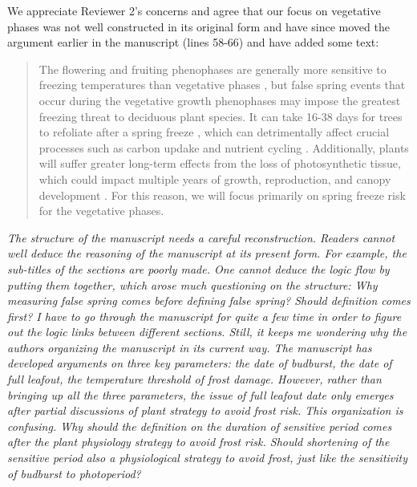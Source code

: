\documentclass[11pt,a4paper]{article}
\begin{document}
We appreciate Reviewer 2's concerns and agree that our focus on vegetative phases was not well constructed in its original form and have since moved the argument earlier in the manuscript (lines 58-66) and have added some text: \\

\begin{quote}
The flowering and fruiting phenophases are generally more sensitive to freezing temperatures than vegetative phases \citep{Inouye2000, Augspurger2009, Caradonna2016, Lenz2013}, but false spring events that occur during the vegetative growth phenophases may impose the greatest freezing threat to deciduous plant species. It can take 16-38 days for trees to refoliate after a spring freeze \citep{Gu2008, Augspurger2009, Augspurger2013, Menzel2015}, which can detrimentally affect crucial processes such as carbon updake and nutrient cycling \citep{Hufkens2012, Richardson2013, Klosterman2018}. Additionally, plants will suffer greater long-term effects from the loss of photosynthetic tissue, which could impact multiple years of growth, reproduction, and canopy development \citep{Vitasse2014, Xie2015}.  For this reason, we will focus primarily on spring freeze risk for the vegetative phases.
\end{quote}


\textit{The structure of the manuscript needs a careful reconstruction. Readers cannot well deduce the reasoning of the manuscript at its present form. For example, the sub-titles of the sections are poorly made. One cannot deduce the logic flow by putting them together, which arose much questioning on the structure: Why measuring false spring comes before defining false spring? Should definition comes first? I have to go through the manuscript for quite a few time in order to figure out the logic links between different sections. Still, it keeps me wondering why the authors organizing the manuscript in its current way. The manuscript has developed arguments on three key parameters: the date of budburst, the date of full leafout, the temperature threshold of frost damage. However, rather than bringing up all the three parameters, the issue of full leafout date only emerges after partial discussions of plant strategy to avoid frost risk. This organization is confusing. Why should the definition on the duration of sensitive period comes after the plant physiology strategy to avoid frost risk. Should shortening of the sensitive period also a physiological strategy to avoid frost, just like the sensitivity of budburst to photoperiod? } \\
\end{document}
